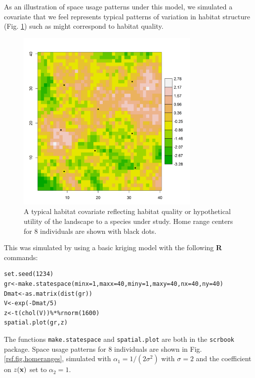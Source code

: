 As an illustration of space usage patterns under this model, we
simulated a covariate that we feel represents typical patterns of
variation in habitat
structure (Fig. \ref{rsf.fig.habitat}) such as might correspond to
habitat quality. 
\begin{figure}
\centering
\includegraphics[width=3.5in,height=3.5in]{Ch10b/figs/habitat}
\caption{A typical habitat covariate reflecting habitat quality or
  hypothetical utility of the landscape to a species under study. Home range centers for 8 individuals are
shown with black dots.}
\label{rsf.fig.habitat}
\end{figure}
This was simulated by using a
basic kriging model with the following {\bf R} commands:
\begin{verbatim}
set.seed(1234)
gr<-make.statespace(minx=1,maxx=40,miny=1,maxy=40,nx=40,ny=40)
Dmat<-as.matrix(dist(gr))
V<-exp(-Dmat/5)
z<-t(chol(V))%*%rnorm(1600)
spatial.plot(gr,z)
\end{verbatim}
The functions \mbox{\tt make.statespace} and \mbox{\tt spatial.plot} are
both in the \mbox{\tt scrbook} package.
Space usage patterns for 
 8 individuals are shown in Fig. \ref{rsf.fig.homeranges},
simulated with $\alpha_{1} = 1/(2\sigma^2)$ with $\sigma = 2$ and the
coefficient on $z({\bf x})$ set to $\alpha_{2} = 1$.  
